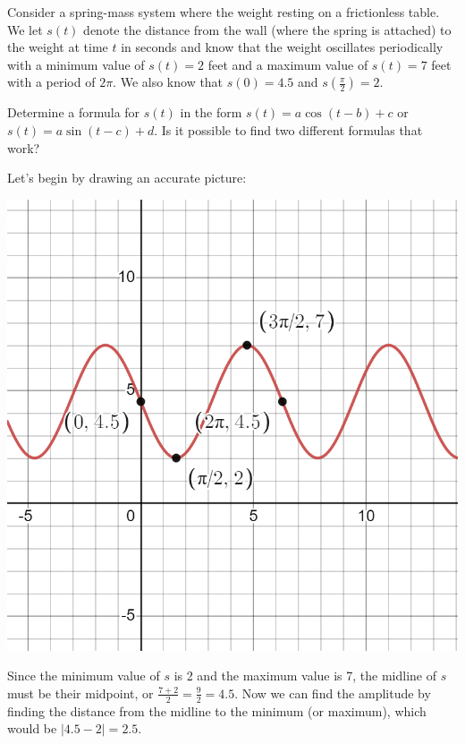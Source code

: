 \documentclass{ximera}
\begin{document}
\begin{example}
Consider a spring-mass system where the weight resting on a frictionless table.  We let \(s(t)\) denote the distance from the wall (where the spring is attached) to the weight at time \(t\) in seconds and know that the weight oscillates periodically with a minimum value of \(s(t) = 2\) feet and a maximum value of \(s(t) = 7\) feet with a period of \(2 \pi\).  We also know that \(s(0) = 4.5\) and \(s\left(\frac{\pi}{2}\right) = 2\).%

Determine a formula for \(s(t)\) in the form \(s(t) = a\cos(t-b)+c\) or \(s(t) = a\sin(t-c)+d\).  Is it possible to find two different formulas that work?  
\begin{explanation}
Let's begin by drawing an accurate picture:
\begin{image}
\includegraphics[width=0.8\linewidth]{images/spring-ex.png}
\end{image}

Since the minimum value of $s$ is 2 and the maximum value is 7, the midline of $s$ must be their midpoint, or $\frac{7+2}{2} = \frac{9}{2} = 4.5$. Now we can find the amplitude by finding the distance from the midline to the minimum (or maximum), which would be $|4.5 - 2| = 2.5$. 


\end{explanation}
\end{example}
\end{document}
